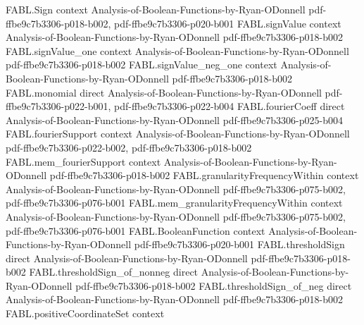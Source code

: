 \begin{theorem}
\label{FABL.fourthMoment_le_eightyOne_of_slice}
\leanok
{}
\proofstep
  {FABL.Sign}
  {context}
  {Analysis-of-Boolean-Functions-by-Ryan-ODonnell}
  {pdf-ffbe9c7b3306-p018-b002,
    pdf-ffbe9c7b3306-p020-b001}
\proofstep
  {FABL.signValue}
  {context}
  {Analysis-of-Boolean-Functions-by-Ryan-ODonnell}
  {pdf-ffbe9c7b3306-p018-b002}
\proofstep
  {FABL.signValue_one}
  {context}
  {Analysis-of-Boolean-Functions-by-Ryan-ODonnell}
  {pdf-ffbe9c7b3306-p018-b002}
\proofstep
  {FABL.signValue_neg_one}
  {context}
  {Analysis-of-Boolean-Functions-by-Ryan-ODonnell}
  {pdf-ffbe9c7b3306-p018-b002}
\proofstep
  {FABL.monomial}
  {direct}
  {Analysis-of-Boolean-Functions-by-Ryan-ODonnell}
  {pdf-ffbe9c7b3306-p022-b001,
    pdf-ffbe9c7b3306-p022-b004}
\proofstep
  {FABL.fourierCoeff}
  {direct}
  {Analysis-of-Boolean-Functions-by-Ryan-ODonnell}
  {pdf-ffbe9c7b3306-p025-b004}
\proofstep
  {FABL.fourierSupport}
  {context}
  {Analysis-of-Boolean-Functions-by-Ryan-ODonnell}
  {pdf-ffbe9c7b3306-p022-b002,
    pdf-ffbe9c7b3306-p018-b002}
\proofstep
  {FABL.mem_fourierSupport}
  {context}
  {Analysis-of-Boolean-Functions-by-Ryan-ODonnell}
  {pdf-ffbe9c7b3306-p018-b002}
\proofstep
  {FABL.granularityFrequencyWithin}
  {context}
  {Analysis-of-Boolean-Functions-by-Ryan-ODonnell}
  {pdf-ffbe9c7b3306-p075-b002,
    pdf-ffbe9c7b3306-p076-b001}
\proofstep
  {FABL.mem_granularityFrequencyWithin}
  {context}
  {Analysis-of-Boolean-Functions-by-Ryan-ODonnell}
  {pdf-ffbe9c7b3306-p075-b002,
    pdf-ffbe9c7b3306-p076-b001}
\proofstep
  {FABL.BooleanFunction}
  {context}
  {Analysis-of-Boolean-Functions-by-Ryan-ODonnell}
  {pdf-ffbe9c7b3306-p020-b001}
\proofstep
  {FABL.thresholdSign}
  {direct}
  {Analysis-of-Boolean-Functions-by-Ryan-ODonnell}
  {pdf-ffbe9c7b3306-p018-b002}
\proofstep
  {FABL.thresholdSign_of_nonneg}
  {direct}
  {Analysis-of-Boolean-Functions-by-Ryan-ODonnell}
  {pdf-ffbe9c7b3306-p018-b002}
\proofstep
  {FABL.thresholdSign_of_neg}
  {direct}
  {Analysis-of-Boolean-Functions-by-Ryan-ODonnell}
  {pdf-ffbe9c7b3306-p018-b002}
\proofstep
  {FABL.positiveCoordinateSet}
  {context}

\end{theorem}
